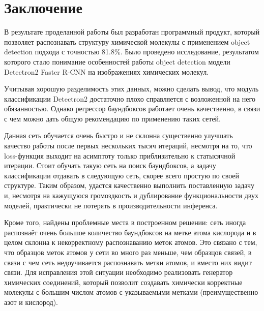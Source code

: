 \chapter*{Заключение} \label{ch-conclusion}

В результате проделанной работы был разработан программный продукт, который позволяет распознавать структуру химической молекулы с применением object detection подхода с точностью 81.8\%. Было проведено исследование, результатом которого стало понимание особенностей работы object detection модели Detectron2 Faster R-CNN на изображениях химических молекул.

Учитывая хорошую разделимость этих данных, можно сделать вывод, что модуль классификации Detectron2 достаточно плохо справляется с возложенной на него обязанностью. Однако регрессор баундбоксов работает очень качественно, в связи с чем можно дать общую рекомендацию по применению таких сетей.

Данная сеть обучается очень быстро и не склонна существенно улучшать качество работы после первых нескольких тысяч итераций, несмотря на то, что loss-функция выходит на асимптоту только приблизительно к статысячной итерации. Стоит обучать такую сеть на поиск баундбоксов, а задачу классификации отдавать в следующую сеть, скорее всего простую по своей структуре. Таким образом, удастся качественно выполнить поставленную задачу и, несмотря на кажущуюся громоздкость и дублирование функциональности двух моделей, практически не потерять в производительности инференса.

Кроме того, найдены проблемные места в построенном решении: сеть иногда распознаёт очень большое количество баундбоксов на метке атома кислорода и в целом склонна к некорректному распознаванию меток атомов. Это связано с тем, что образцов меток атомов у сети во много раз меньше, чем образцов связей, в связи с чем сеть недоучивается распознавать метки атомов, и вместо них видит связи. Для исправления этой ситуации необходимо реализовать генератор химических соединений, который позволит создавать химически корректные молекулы с большим числом атомов с указываемыми метками (преимущественно азот и кислород).

